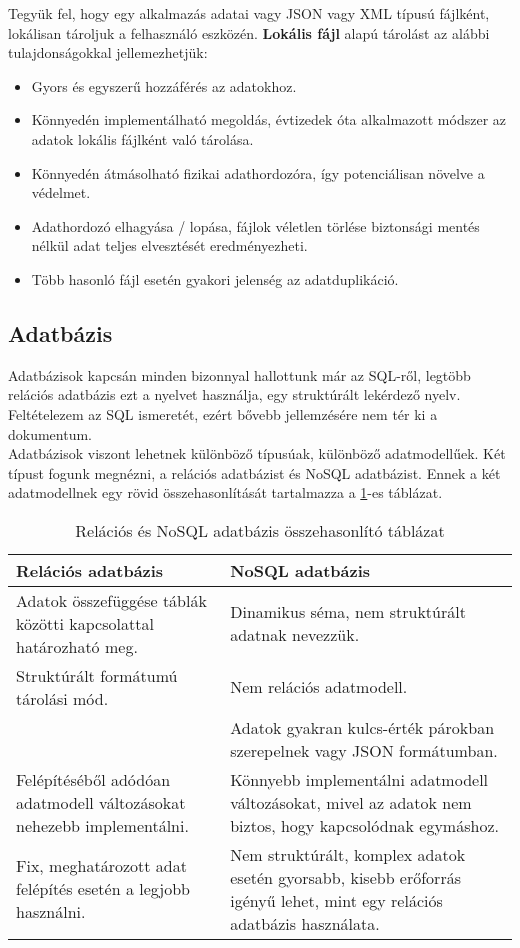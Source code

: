 \vspace{6pt}
\noindent Tegyük fel, hogy egy alkalmazás adatai vagy JSON vagy XML típusú fájlként, lokálisan tároljuk a felhasználó eszközén. \textbf{Lokális fájl} alapú tárolást az alábbi tulajdonságokkal jellemezhetjük:
\begin{itemize}
	\item Gyors és egyszerű hozzáférés az adatokhoz.
	\item Könnyedén implementálható megoldás, évtizedek óta alkalmazott módszer az adatok lokális fájlként való tárolása.
	\item Könnyedén átmásolható fizikai adathordozóra, így potenciálisan növelve a védelmet.
	\item Adathordozó elhagyása / lopása, fájlok véletlen törlése biztonsági mentés nélkül adat teljes elvesztését eredményezheti.
	\item Több hasonló fájl esetén gyakori jelenség az adatduplikáció. 
\end{itemize}


\newpage
\subsection{Adatbázis}

Adatbázisok kapcsán minden bizonnyal hallottunk már az SQL-ről, legtöbb relációs adatbázis ezt a nyelvet használja, egy struktúrált lekérdező nyelv. Feltételezem az SQL ismeretét, ezért bővebb jellemzésére nem tér ki a dokumentum. 
\\Adatbázisok viszont lehetnek különböző típusúak, különböző adatmodellűek. Két típust fogunk megnézni, a relációs adatbázist és NoSQL adatbázist. Ennek a két adatmodellnek egy rövid összehasonlítását tartalmazza a \ref{tab:rdbmsandnosql}-es táblázat.

\begin{table}[H]
	\centering
	\caption{Relációs és NoSQL adatbázis összehasonlító táblázat}
	\label{tab:rdbmsandnosql}
	\medskip	
	\begin{tabular}{|p{7.2cm}|p{7.2cm}|}
		\hline
		\textbf{Relációs adatbázis} & \textbf{NoSQL adatbázis} \\
		\hline
		Adatok összefüggése táblák közötti kapcsolattal határozható meg. &  Dinamikus séma, nem struktúrált adatnak nevezzük.\\
		Struktúrált formátumú tárolási mód. & Nem relációs adatmodell.\\
		& Adatok gyakran kulcs-érték párokban szerepelnek vagy JSON formátumban.\\
		\hline
		Felépítéséből adódóan adatmodell változásokat nehezebb implementálni. & Könnyebb implementálni adatmodell változásokat, mivel az adatok nem biztos, hogy kapcsolódnak egymáshoz. \\
		\hline
		Fix, meghatározott adat felépítés esetén a legjobb használni. & Nem struktúrált, komplex adatok esetén gyorsabb, kisebb erőforrás igényű lehet, mint egy relációs adatbázis használata.\\
		\hline
	\end{tabular}
\end{table}


